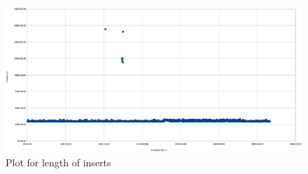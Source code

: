 \begin{enumerate}
\begin{figure}[h]
  \centering
  \includegraphics[scale=0.2]{img/plot}
  \caption{Plot for length of inserts}
  \label{img:plot}
\end{figure}

\end{enumerate}
